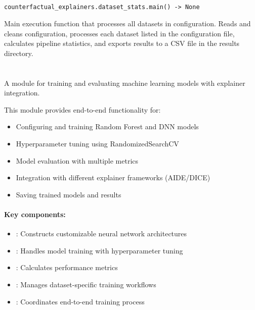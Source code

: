 \subsection{}
\label{func:dataset_stats_main}

\begin{lstlisting}
counterfactual_explainers.dataset_stats.main() -> None
\end{lstlisting}

Main execution function that processes all datasets in configuration. Reads and cleans configuration, processes each dataset listed in the configuration file, calculates pipeline statistics, and exports results to a CSV file in the results directory.

\section{}
\label{sec:train_models}

A module for training and evaluating machine learning models with explainer integration.

This module provides end-to-end functionality for:
\begin{itemize}
    \item Configuring and training Random Forest and DNN models
    \item Hyperparameter tuning using RandomizedSearchCV
    \item Model evaluation with multiple metrics
    \item Integration with different explainer frameworks (AIDE/DICE)
    \item Saving trained models and results
\end{itemize}

\paragraph{Key components:}
\begin{itemize}
    \item {}: Constructs customizable neural network architectures
    \item {}: Handles model training with hyperparameter tuning
    \item {}: Calculates performance metrics
    \item {}: Manages dataset-specific training workflows
    \item {}: Coordinates end-to-end training process
\end{itemize}


